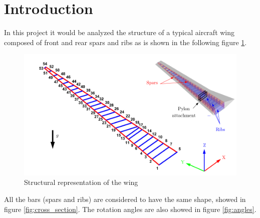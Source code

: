 \section{Introduction}

In this project it would be analyzed the structure of a typical aircraft wing
composed of front and rear spars and ribs as is shown in the following figure
\ref{fig:wing_structure}.

\begin{figure}[h]
	\centering
	\includegraphics[width=\textwidth]{img/structural_wing.png}
	\caption{Structural representation of the wing}
	\label{fig:wing_structure}
\end{figure}

All the bars (spars and ribs) are considered to have the same shape, showed in figure
\ref{fig:cross_section}. The rotation angles are also showed in figure \ref{fig:angles}.

